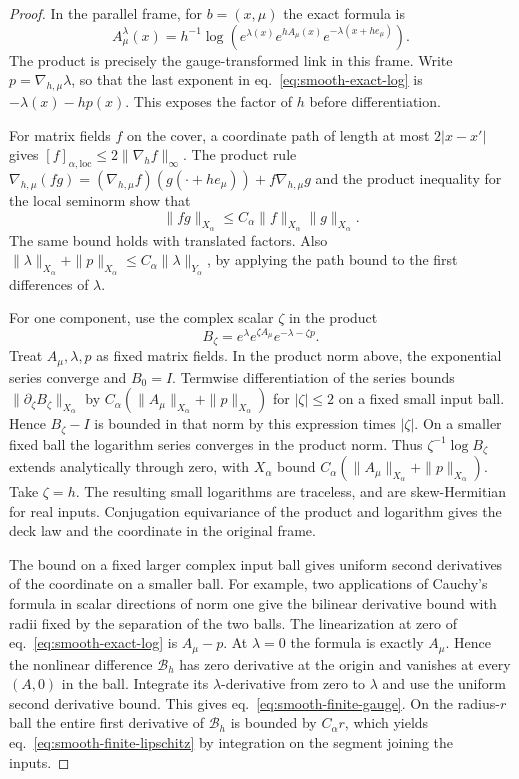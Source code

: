 \documentclass[11pt,letterpaper,reqno]{amsart}
\numberwithin{equation}{section}
\renewcommand{\eqref}[1]{\textup{eq.~\ref{#1}}}
\theoremstyle{definition}
\theoremstyle{remark}
\begin{document}
\begin{proof}
In the parallel frame, for \(b=(x,\mu)\) the exact formula is
\begin{equation}\label{eq:smooth-exact-log}
 A^\lambda_\mu(x)
 =h^{-1}\log\!\left(
       e^{\lambda(x)}e^{hA_\mu(x)}e^{-\lambda(x+h e_\mu)}
           \right).
\end{equation}
The product is precisely the gauge-transformed link in this frame.
Write \(p=\nabla_{h,\mu}\lambda\), so that the last exponent
in \eqref{eq:smooth-exact-log} is \(-\lambda(x)-hp(x)\).
This exposes the factor of \(h\) before differentiation.

For matrix fields \(f\) on the cover, a coordinate path of length
at most \(2|x-x'|\) gives
\([f]_{\alpha,\mathrm{loc}}\leq 2\|\nabla_h f\|_\infty\).
The product rule
\(\nabla_{h,\mu}(fg)=(\nabla_{h,\mu}f)(g(\cdot+h e_\mu))
                          +f\nabla_{h,\mu}g\)
and the product inequality for the local seminorm show that
\[
                    \|fg\|_{X_\alpha}
                    \leq C_\alpha\|f\|_{X_\alpha}\|g\|_{X_\alpha}.
\]
The same bound holds with translated factors. Also
\(\|\lambda\|_{X_\alpha}+\|p\|_{X_\alpha}\leq
C_\alpha\|\lambda\|_{Y_\alpha}\), by applying the path bound
to the first differences of \(\lambda\).

For one component, use the complex scalar \(\zeta\) in the product
\[
               B_\zeta=e^\lambda e^{\zeta A_\mu}
                                           e^{-\lambda-\zeta p}.
\]
Treat \(A_\mu,\lambda,p\) as fixed matrix fields. In the product
norm above, the exponential series converge and \(B_0=I\).
Termwise differentiation of the series bounds
\(\|\partial_\zeta B_\zeta\|_{X_\alpha}\) by
\(C_\alpha(\|A_\mu\|_{X_\alpha}+\|p\|_{X_\alpha})\)
for \(|\zeta|\leq2\) on a fixed small input ball.
Hence \(B_\zeta-I\) is bounded in that norm by this expression
times \(|\zeta|\). On a smaller fixed ball the logarithm series
converges in the product norm. Thus
\(\zeta^{-1}\log B_\zeta\) extends analytically through zero,
with \(X_\alpha\) bound
\(C_\alpha(\|A_\mu\|_{X_\alpha}+\|p\|_{X_\alpha})\).
Take \(\zeta=h\). The resulting small logarithms are traceless,
and are skew-Hermitian for real inputs. Conjugation equivariance
of the product and logarithm gives the deck law and the coordinate
in the original frame.

The bound on a fixed larger complex input ball gives uniform
second derivatives of the coordinate on a smaller ball. For
example, two applications of Cauchy's formula in scalar directions
of norm one give the bilinear derivative bound with radii fixed
by the separation of the two balls. The linearization at zero of
\eqref{eq:smooth-exact-log} is \(A_\mu-p\). At \(\lambda=0\)
the formula is exactly \(A_\mu\). Hence the nonlinear difference
\(\mathcal B_h\) has zero derivative at the origin and vanishes
at every \((A,0)\) in the ball. Integrate its \(\lambda\)-derivative
from zero to \(\lambda\) and use the uniform second derivative
bound. This gives \eqref{eq:smooth-finite-gauge}. On the
radius-\(r\) ball the entire first derivative of \(\mathcal B_h\)
is bounded by \(C_\alpha r\), which yields
\eqref{eq:smooth-finite-lipschitz} by integration on the segment
joining the inputs.
\end{proof}
\end{document}
